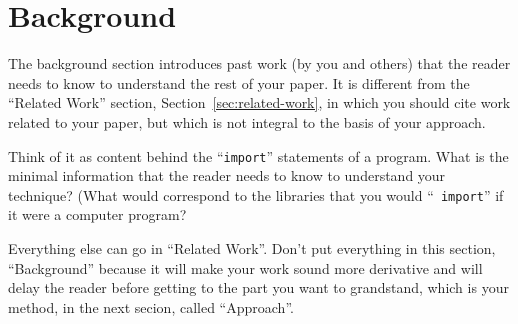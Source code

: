 \section{Background}
\label{sec:background}

The background section introduces past work (by you and others) that the reader
needs to know to understand the rest of your paper.
%
It is different from the ``Related Work'' section,
Section~\ref{sec:related-work}, in which you should cite work related to your
paper, but which is not integral to the basis of your approach.

Think of it as content behind the ``{\tt import}'' statements of a program. What
is the minimal information that the reader needs to know to understand your
technique? (What would correspond to the libraries that you would ``{\tt
import}'' if it were a computer program?

Everything else can go in ``Related Work''. Don't put everything in this
section, ``Background'' because it will make your work sound more derivative and
will delay the reader before getting to the part you want to grandstand, which
is your method, in the next secion, called ``Approach''.


